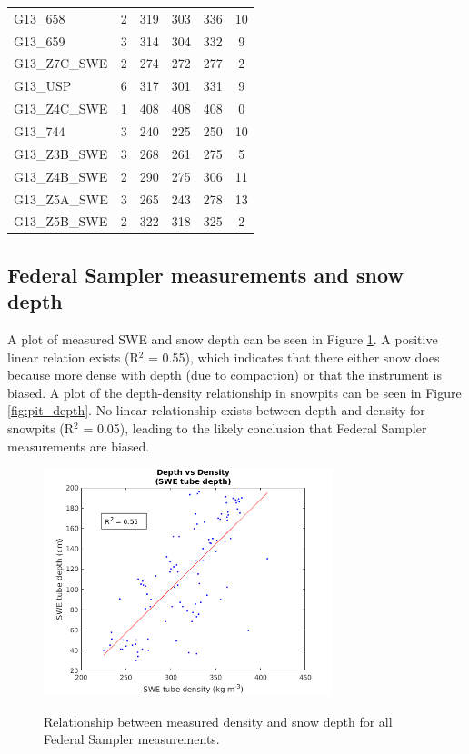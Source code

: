 \documentclass[12pt]{article}
\begin{document}
\begin{table}[]
\begin{tabular}{lccccc}
G13\_658 & 2 & 319 & 303 & 336 & 10 \\
G13\_659 & 3 & 314 & 304 & 332 & 9 \\
G13\_Z7C\_SWE & 2 & 274 & 272 & 277 & 2 \\
G13\_USP & 6 & 317 & 301 & 331 & 9 \\
G13\_Z4C\_SWE & 1 & 408 & 408 & 408 & 0 \\
G13\_744 & 3 & 240 & 225 & 250 & 10 \\
G13\_Z3B\_SWE & 3 & 268 & 261 & 275 & 5 \\
G13\_Z4B\_SWE & 2 & 290 & 275 & 306 & 11 \\
G13\_Z5A\_SWE & 3 & 265 & 243 & 278 & 13 \\
G13\_Z5B\_SWE & 2 & 322 & 318 & 325 & 2
\end{tabular}
\end{table}

\subsection*{Federal Sampler measurements and snow depth}

A plot of measured SWE and snow depth can be seen in Figure \ref{fig:tube_depth}. A positive linear relation exists (R$^2$ = 0.55), which indicates that there either snow does because more dense with depth (due to compaction) or that the instrument is biased. A plot of the depth-density relationship in snowpits can be seen in Figure \ref{fig:pit_depth}. No linear relationship exists between depth and density for snowpits (R$^2$ = 0.05), leading to the likely conclusion that Federal Sampler measurements are biased. 

\begin{figure} 
	\centering
	\includegraphics[width =0.75\textwidth]{DepthDensity_SWEtube.png}\\
	\caption{Relationship between measured density and snow depth for all Federal Sampler measurements.}
	\label{fig:tube_depth}
\end{figure}
\end{document}
